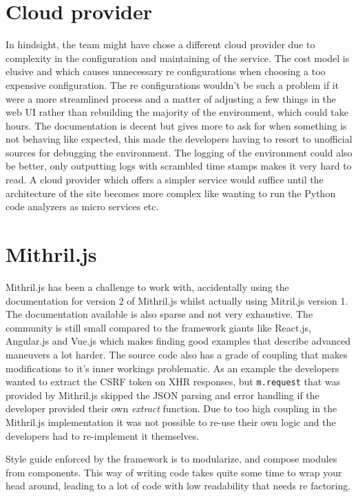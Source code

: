 \documentclass[12pt,a4paper]{report}
\begin{document}
\section{Cloud provider}
In hindsight, the team might have chose a different cloud provider due to complexity in the configuration and maintaining of the service. The cost model is elusive and which causes unnecessary re configurations when choosing a too expensive configuration. The re configurations wouldn't be such a problem if it were a more streamlined process and a matter of adjusting a few things in the web UI rather than rebuilding the majority of the environment, which could take hours. The documentation is decent but gives more to ask for when something is not behaving like expected, this made the developers having to resort to unofficial sources for debugging the environment. The logging of the environment could also be better, only outputting logs with scrambled time stamps makes it very hard to read. A cloud provider which offers a simpler service would suffice until the architecture of the site becomes more complex like wanting to run the Python code analyzers as micro services etc. 

\section{Mithril.js}
Mithril.js has been a challenge to work with, accidentally using the documentation for version 2 of Mithril.js whilst actually using Mitril.js version 1. The documentation available is also sparse and not very exhaustive. The community is still small compared to the framework giants like React.js, Angular.js and Vue.js which makes finding good examples that describe advanced maneuvers a lot harder. The source code also has a grade of coupling that makes modifications to it's inner workings problematic. As an example the developers wanted to extract the CSRF token on XHR responses, but \texttt{m.request} that was provided by Mithril.js skipped the JSON parsing and error handling if the developer provided their own \textit{extract} function. Due to too high coupling in the Mithril.js implementation it was not possible to re-use their own logic and the developers had to re-implement it themselves.

Style guide enforced by the framework is to modularize, and compose modules from components. This way of writing code takes quite some time to wrap your head around, leading to a lot of code with low readability that needs re factoring.
\end{document}
